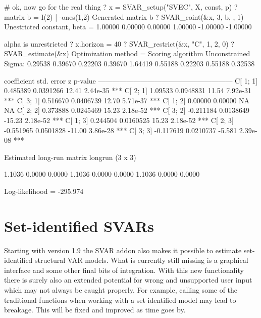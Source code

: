 \documentclass[a4paper,10pt]{article}
\begin{document}
\begin{code}
# ok, now go for the real thing
? x = SVAR_setup("SVEC", X, const, p)
? matrix b = I(2) | -ones(1,2)
Generated matrix b
? SVAR_coint(&x, 3, b, {}, 1)
Unestricted constant, beta =
  1.00000  0.00000
  0.00000  1.00000
 -1.00000 -1.00000

alpha is unrestricted
? x.horizon = 40
? SVAR_restrict(&x, "C", 1, 2, 0)
? SVAR_estimate(&x)
Optimization method = Scoring algorithm
Unconstrained Sigma:
     0.29538     0.39670     0.22203
     0.39670     1.64419     0.55188
     0.22203     0.55188     0.32538


             coefficient   std. error      z       p-value 
  ---------------------------------------------------------
  C[ 1; 1]     0.485389    0.0391266     12.41     2.44e-35 ***
  C[ 2; 1]     1.09533     0.0948831     11.54     7.92e-31 ***
  C[ 3; 1]     0.516670    0.0406739     12.70     5.71e-37 ***
  C[ 1; 2]     0.00000     0.00000       NA       NA       
  C[ 2; 2]     0.373888    0.0245469     15.23     2.18e-52 ***
  C[ 3; 2]    -0.211184    0.0138649    -15.23     2.18e-52 ***
  C[ 1; 3]     0.244504    0.0160525     15.23     2.18e-52 ***
  C[ 2; 3]    -0.551965    0.0501828    -11.00     3.86e-28 ***
  C[ 3; 3]    -0.117619    0.0210737     -5.581    2.39e-08 ***

Estimated long-run matrix
longrun (3 x 3)

      1.1036       0.0000       0.0000 
      1.1036       0.0000       0.0000 
      1.1036       0.0000       0.0000 
	  
  Log-likelihood = -295.974
\end{code}


\section{Set-identified SVARs}\label{sec:SR}

Starting with version 1.9 the SVAR addon also makes it possible to
estimate set-identified structural VAR models.  What is currently
still missing is a graphical interface and some other final bits of
integration. With this new functionality there is surely also an
extended potential for wrong and unsupported user input which may not
always be caught properly.  For example, calling some of the
traditional functions when working with a set identified model may
lead to breakage. This will be fixed and improved as time goes by.
\end{document}
